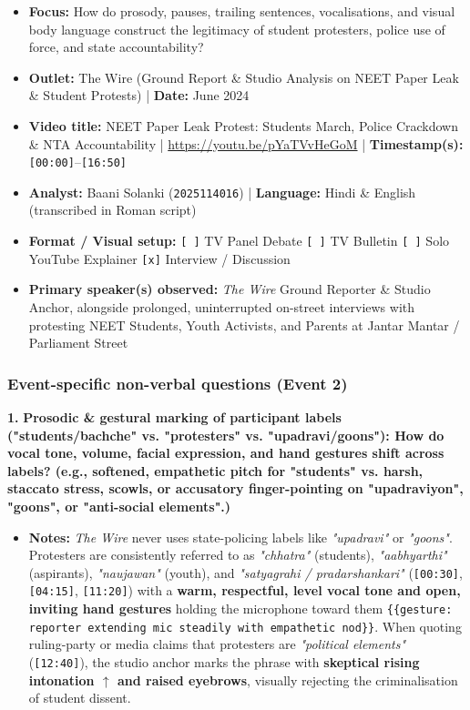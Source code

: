 \documentclass[10pt,a4paper]{article}
\begin{document}
\begin{itemize}
  \item \textbf{Focus:} How do prosody, pauses, trailing sentences, vocalisations, and visual body language construct the legitimacy of student protesters, police use of force, and state accountability?
  \item \textbf{Outlet:} The Wire (Ground Report \& Studio Analysis on NEET Paper Leak \& Student Protests) | \textbf{Date:} June 2024
  \item \textbf{Video title:} NEET Paper Leak Protest: Students March, Police Crackdown \& NTA Accountability | \href{https://youtu.be/pYaTVvHeGoM}{https://youtu.be/pYaTVvHeGoM} | \textbf{Timestamp(s):} \texttt{[00:00]}--\texttt{[16:50]}
  \item \textbf{Analyst:} Baani Solanki (\texttt{2025114016}) | \textbf{Language:} Hindi \& English (transcribed in Roman script)
  \item \textbf{Format / Visual setup:} \texttt{[ ]} TV Panel Debate \texttt{[ ]} TV Bulletin \texttt{[ ]} Solo YouTube Explainer \texttt{[x]} Interview / Discussion
  \item \textbf{Primary speaker(s) observed:} \textit{The Wire} Ground Reporter \& Studio Anchor, alongside prolonged, uninterrupted on-street interviews with protesting NEET Students, Youth Activists, and Parents at Jantar Mantar / Parliament Street
\end{itemize}

\subsubsection*{Event-specific non-verbal questions (Event 2)}

\noindent\textbf{1.} \textbf{Prosodic \& gestural marking of participant labels ("students/bachche" vs. "protesters" vs. "upadravi/goons"): How do vocal tone, volume, facial expression, and hand gestures shift across labels? (e.g., softened, empathetic pitch for "students" vs. harsh, staccato stress, scowls, or accusatory finger-pointing on "upadraviyon", "goons", or "anti-social elements".)}\par\smallskip
\begin{itemize}
  \item \textbf{Notes:}
\textit{The Wire} never uses state-policing labels like \textit{"upadravi"} or \textit{"goons"}. Protesters are consistently referred to as \textit{"chhatra"} (students), \textit{"aabhyarthi"} (aspirants), \textit{"naujawan"} (youth), and \textit{"satyagrahi / pradarshankari"} (\texttt{[00:30]}, \texttt{[04:15]}, \texttt{[11:20]}) with a \textbf{warm, respectful, level vocal tone and open, inviting hand gestures} holding the microphone toward them \texttt{\{\{gesture: reporter extending mic steadily with empathetic nod\}\}}. When quoting ruling-party or media claims that protesters are \textit{"political elements"} (\texttt{[12:40]}), the studio anchor marks the phrase with \textbf{skeptical rising intonation \texttt{$\uparrow$} and raised eyebrows}, visually rejecting the criminalisation of student dissent.\par\smallskip
\end{itemize}
\end{document}
